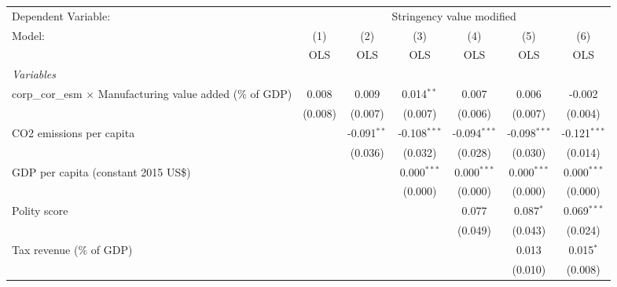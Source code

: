 
\begingroup
\centering
\begin{tabular}{lcccccc}
   \toprule
   Dependent Variable: & \multicolumn{6}{c}{Stringency value modified}\\
   Model:                                                            & (1)     & (2)           & (3)            & (4)            & (5)            & (6)\\  
                                                                     &  OLS    & OLS           & OLS            & OLS            & OLS            & OLS\\  
   \midrule
   \emph{Variables}\\
   corp\_cor\_esm $\times$ Manufacturing value added (\% of GDP)     & 0.008   & 0.009         & 0.014$^{**}$   & 0.007          & 0.006          & -0.002\\   
                                                                     & (0.008) & (0.007)       & (0.007)        & (0.006)        & (0.007)        & (0.004)\\   
   CO2 emissions per capita                                          &         & -0.091$^{**}$ & -0.108$^{***}$ & -0.094$^{***}$ & -0.098$^{***}$ & -0.121$^{***}$\\   
                                                                     &         & (0.036)       & (0.032)        & (0.028)        & (0.030)        & (0.014)\\   
   GDP per capita (constant 2015 US\$)                               &         &               & 0.000$^{***}$  & 0.000$^{***}$  & 0.000$^{***}$  & 0.000$^{***}$\\   
                                                                     &         &               & (0.000)        & (0.000)        & (0.000)        & (0.000)\\   
   Polity score                                                      &         &               &                & 0.077          & 0.087$^{*}$    & 0.069$^{***}$\\   
                                                                     &         &               &                & (0.049)        & (0.043)        & (0.024)\\   
   Tax revenue (\% of GDP)                                           &         &               &                &                & 0.013          & 0.015$^{*}$\\   
                                                                     &         &               &                &                & (0.010)        & (0.008)\\   

\end{tabular}
